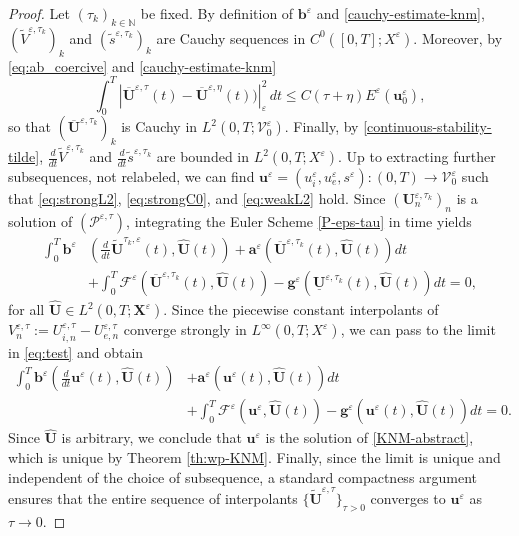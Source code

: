\documentclass[a4paper,11pt]{article}
\theoremstyle{definition}
\numberwithin{equation}{section}
\newcommand{\e}{\varepsilon}
\newcommand{\V}{\mathcal{V}}
\begin{document}
\begin{proof}
	Let $(\tau_k)_{k \in \mathbb{N}}$ be fixed. By definition of $\mathbf{b}^\e$ and \eqref{cauchy-estimate-knm}, $(\widetilde V^{\e,\tau_k})_k$ and $(\widetilde{s}^{\e,\tau_k})_k$ are Cauchy sequences in $C^0([0,T]; X^\e)$. Moreover, by \eqref{eq:ab_coercive} and \eqref{cauchy-estimate-knm}
	\[
	\int_0^T  \left|\overline{\mathbf{U}}^{\e, \tau}(t) - \overline{\mathbf{U}}^{\e, \eta}(t))\right|_\e^2 \, dt \le C(\tau + \eta) E^\e(\mathbf{u}_0^\e),
	\]
	so that $(\overline{\mathbf{U}}^{\e, \tau_k})_k$ is Cauchy in $L^2(0,T;\V_0^\e)$. Finally, by \eqref{continuous-stability-tilde}, $\frac{d}{dt}\widetilde V^{\e,\tau_k}$ and $\frac{d}{dt}\widetilde{s}^{\e,\tau_k}$ are bounded in $L^2(0,T;X^\e)$. Up to extracting further subsequences, not relabeled, we can find $\mathbf{u}^\e = (u_i^\e,u_e^\e,s^\e):(0,T)\to\V_0^\e$ such that \eqref{eq:strongL2}, \eqref{eq:strongC0}, and \eqref{eq:weakL2} hold. Since $(\mathbf{U}^{\e,\tau_k}_n)_n$ is a solution of $(\mathcal{P}^{\e,\tau})$, integrating the Euler Scheme \eqref{P-eps-tau} in time yields
	\begin{equation}
		\label{eq:test}
		\begin{split}
			\int_0^T \mathbf{b}^\e &\left( \frac{d}{dt} \widetilde{\mathbf{U}}^{\tau_k,\e}(t), \widehat{\mathbf{U}}(t) \right) + \mathbf{a}^\e\left(\overline{\mathbf{U}}^{\e,\tau_k}(t), \widehat{\mathbf{U}}(t)\right)dt\\
			& +\int_0^T \mathcal{F}^\e\left(\overline{\mathbf{U}}^{\e,\tau_k}(t), \widehat{\mathbf{U}}(t)\right) -\mathbf{g}^\e\left(\underline{\mathbf{U}}^{\e,\tau_k}(t), \widehat{\mathbf{U}}(t)\right)dt=0,
		\end{split}
	\end{equation}
	for all $\widehat{\mathbf{U}} \in L^2(0,T;\mathbf{X}^\e)$. Since the piecewise constant interpolants of $V_n^{\e,\tau}:= U_{i,n}^{\e, \tau}-U_{e,n}^{\e, \tau}$ converge strongly in $L^\infty(0,T;X^\e)$, we can pass to the limit in \eqref{eq:test} and obtain
	\begin{equation*}
		\begin{split}
			\int_0^T \mathbf{b}^\e \left( \frac{d}{dt} \mathbf{u}^\e (t), \widehat{\mathbf{U}}(t) \right) & + \mathbf{a}^\e\left(\mathbf{u}^\e(t), \widehat{\mathbf{U}}(t)\right)dt\\
			& +\int_0^T \mathcal{F}^\e\left(\mathbf{u}^\e, \widehat{\mathbf{U}}(t)\right) -\mathbf{g}^\e\left(\mathbf{u}^\e(t), \widehat{\mathbf{U}}(t)\right)dt=0.
		\end{split}
	\end{equation*}
	Since $\widehat{\mathbf{U}}$ is arbitrary, we conclude that $\mathbf{u}^\e$ is the solution of \eqref{KNM-abstract}, which is unique by Theorem \ref{th:wp-KNM}. Finally, since the limit is unique and independent of the choice of subsequence, a standard compactness argument ensures that the entire sequence of interpolants $\{\widetilde{\mathbf{U}}^{\e, \tau}\}_{\tau > 0}$ converges to $\mathbf{u}^\e$ as $\tau \to 0$.
\end{proof}
\end{document}
